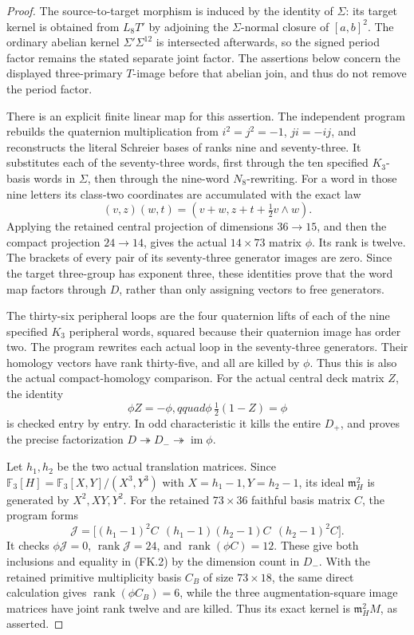 \begin{proof}
The source-to-target morphism is induced by
the identity of \(\Sigma\): its target kernel
is obtained from \(L_8T'\) by adjoining
the \(\Sigma\)-normal closure of \([a,b]^2\).
The ordinary abelian kernel \(\Sigma'\Sigma^{12}\)
is intersected afterwards, so the signed period
factor remains the stated separate joint factor.
The assertions below concern the displayed
three-primary \(T\)-image before that abelian
join, and thus do not remove the period factor.

There is an explicit finite linear map for
this assertion. The independent program rebuilds
the quaternion multiplication from
\(i^2=j^2=-1\), \(ji=-ij\), and reconstructs
the literal Schreier bases of ranks nine and
seventy-three. It substitutes each of the
seventy-three words, first through the ten
specified \(K_3\)-basis words in \(\Sigma\),
then through the nine-word \(N_8\)-rewriting.
For a word in those nine letters its class-two
coordinates are accumulated with the exact law
\[
 (v,z)(w,t)=(v+w,z+t+\tfrac12 v\wedge w).
 \tag{FK.3}
\]
Applying the retained central projection of
dimensions \(36\to15\), and then the compact
projection \(24\to14\), gives the actual
\(14\times73\) matrix \(\phi\).
Its rank is twelve. The brackets of every
pair of its seventy-three generator images
are zero. Since the target three-group has
exponent three, these identities prove that
the word map factors through \(D\), rather
than only assigning vectors to free generators.

The thirty-six peripheral loops are the four
quaternion lifts of each of the nine specified
\(K_3\) peripheral words, squared because
their quaternion image has order two.
The program rewrites each actual loop in
the seventy-three generators. Their homology
vectors have rank thirty-five, and all are
killed by \(\phi\). Thus this is also the
actual compact-homology comparison.
For the actual central deck matrix \(Z\),
the identity
\[
 \phi Z=-\phi,qquad
 \phi\,\tfrac12(1-Z)=\phi
 \tag{FK.4}
\]
is checked entry by entry.
In odd characteristic it kills the entire
\(D_+\), and proves the precise factorization
\(D\twoheadrightarrow D_-\twoheadrightarrow
\operatorname{im}\phi\).

Let \(h_1,h_2\) be the two actual translation
matrices. Since
\(\mathbb F_3[H]=\mathbb F_3[X,Y]/(X^3,Y^3)\)
with \(X=h_1-1,Y=h_2-1\), its ideal
\(\mathfrak m_H^2\) is generated by
\(X^2,XY,Y^2\).
For the retained \(73\times36\) faithful
basis matrix \(C\), the program forms
\[
 \mathcal J=
 \bigl[(h_1-1)^2C\ \ (h_1-1)(h_2-1)C\ \ (h_2-1)^2C\bigr].
 \tag{FK.5}
\]
It checks \(\phi\mathcal J=0\),
\(\operatorname{rank}\mathcal J=24\), and
\(\operatorname{rank}(\phi C)=12\).
These give both inclusions and equality in
(FK.2) by the dimension count in \(D_-\).
With the retained primitive multiplicity
basis \(C_B\) of size \(73\times18\),
the same direct calculation gives
\(\operatorname{rank}(\phi C_B)=6\), while
the three augmentation-square image matrices
have joint rank twelve and are killed.
Thus its exact kernel is
\(\mathfrak m_H^2M\), as asserted.


\end{proof}
